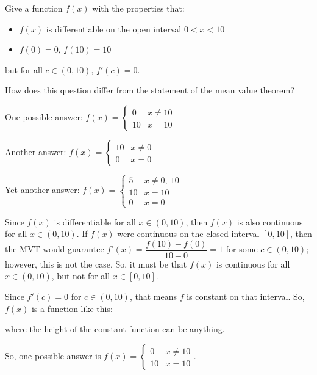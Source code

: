 \begin{question}
Give a function $f(x)$ with the properties that:
\begin{itemize}
\item $f(x)$ is differentiable on the open interval $0<x<10$
\item $f(0)=0$, $f(10)=10$
\end{itemize}
but for all $c \in (0,10)$, $f'(c)=0$.
\end{question}
\begin{hint}
How does this question differ from the statement of the mean value theorem?
\end{hint}
\begin{answer}
One possible answer: $f(x) = \left\{\begin{array}{lr}
0&x \neq 10\\
10&x=10
\end{array}\right.$

Another answer:
$f(x) = \left\{\begin{array}{lr}
10&x \neq 0\\
0&x=0
\end{array}\right.$


Yet another answer:
$f(x) = \left\{\begin{array}{ll}
5&x \neq 0,~10\\
10&x= 10\\
0&x=0
\end{array}\right.$
\end{answer}
\begin{solution}
Since $f(x)$ is differentiable for all $x \in (0,10)$, then $f(x)$ is also continuous for all $x \in (0,10)$. If $f(x)$ were continuous on the closed interval $[0,10]$, then the MVT would guarantee $f'(x)=\dfrac{f(10)-f(0)}{10-0}=1$ for some $c \in (0,10)$; however, this is not the case. So, it must be that $f(x)$ is continuous for all $x \in (0,10)$, but not for all $x \in [0,10]$.

Since $f'(c)=0$ for $c \in (0,10)$, that means $f$ is constant on that interval. So, $f(x)$ is a function like this:
\begin{center}\end{center}
where the height of the constant function can be anything.

So, one possible answer is $f(x) = \left\{\begin{array}{lr}
0&x \neq 10\\
10&x=10
\end{array}\right.$.
\end{solution}


